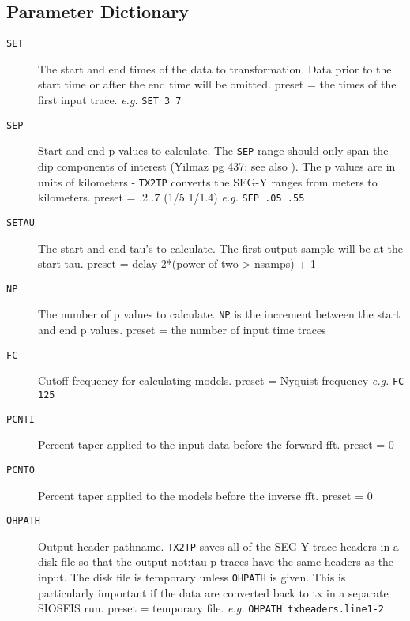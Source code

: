 \subsection{Parameter Dictionary}

\begin{description}
\item[\texttt{SET}] The start and end times of the data to transformation.  Data
         prior to the start time or after the end time will be omitted.
         \Gls{preset} = the times of the first input trace.  \textit{e.g.}  \texttt{SET 3 7}

\item[\texttt{SEP}] Start and end p values to calculate.  The \texttt{SEP} range should only
    span the dip components of interest (Yilmaz pg 437; see also \cite{Yilmaz2001}).  The p
         values are in units of kilometers - \texttt{TX2TP} converts the SEG-Y
         ranges from meters to kilometers.
         \Gls{preset} = .2 .7  (1/5 1/1.4)   \textit{e.g.}  \texttt{SEP .05 .55}

\item[\texttt{SETAU}] The start and end tau's to calculate.  The first output sample
         will be at the start tau.
         \Gls{preset} = delay  2*(power of two > nsamps) + 1

\item[\texttt{NP}] The number of p values to calculate.  \texttt{NP} is the increment
         between the start and end p values.
         \Gls{preset} = the number of input time traces

\item[\texttt{FC}] Cutoff frequency for calculating models.
         \Gls{preset} = Nyquist frequency      \textit{e.g.} \texttt{FC 125}

\item[\texttt{PCNTI}] Percent taper applied to the input data before the forward \gls{fft}.
         \Gls{preset} = 0

\item[\texttt{PCNTO}] Percent taper applied to the models before the inverse \gls{fft}.
         \Gls{preset} = 0

\item[\texttt{OHPATH}] Output header pathname.  \texttt{TX2TP} saves all of the SEG-Y trace
         headers in a disk file so that the output \gls{not:tau}-p traces have the
         same headers as the input.  The disk file is temporary unless
         \texttt{OHPATH} is given.  This is particularly important if the data are
         converted back to tx in a separate SIOSEIS run.
         \Gls{preset} = temporary file.    \textit{e.g.}   \texttt{OHPATH txheaders.line1-2}


\end{description}
